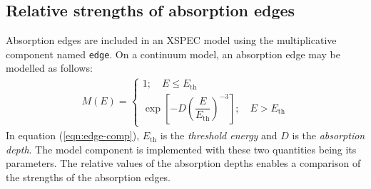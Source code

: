     
    \subsection{Relative strengths of absorption edges}
    Absorption edges are included in an XSPEC model using the multiplicative component named \texttt{edge}. On a continuum model, an absorption edge may be modelled as follows:
    \begin{align}
    	M(E)=\begin{cases}
    		{1;\quad E\leqslant E_\text{th}} \\
    		{\exp{\left[ -D\left(\dfrac{E}{E_\text{th}}\right)^{-3} \right]};\quad E> E_\text{th}}
    	\end{cases} \label{eqn:edge-comp}
    \end{align}
    In equation (\ref{eqn:edge-comp}), $E_\text{th}$ is the \textit{threshold energy} and $D$ is the \textit{absorption depth}. The model component is implemented with these two quantities being its parameters. The relative values of the absorption depths enables a comparison of the strengths of the absorption edges.
    

